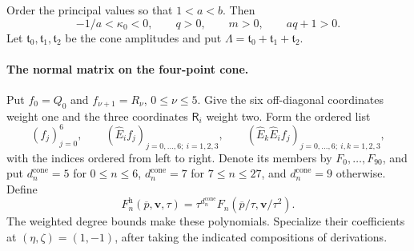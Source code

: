 \documentclass[11pt,a4paper]{article}
\numberwithin{equation}{section}
\theoremstyle{plain}
\theoremstyle{definition}
\theoremstyle{remark}
\begin{document}
Order the principal values so that $1<a<b$. Then
\[
 -1/a<\kappa_0<0,\qquad q>0,\qquad m>0,\qquad aq+1>0.
\]
Let $\mathfrak t_0,\mathfrak t_1,\mathfrak t_2$ be the cone amplitudes and
put $\Lambda=\mathfrak t_0+\mathfrak t_1+\mathfrak t_2$.

\paragraph{The normal matrix on the four-point cone.}
Put $f_0=Q_0$ and $f_{\nu+1}=R_\nu$, $0\le\nu\le5$.
Give the six off-diagonal coordinates weight one and the three
coordinates $\mathsf R_i$ weight two. Form the ordered list
\[
 (f_j)_{j=0}^6,\qquad
 (\widehat E_i f_j)_{j=0,\ldots,6;\ i=1,2,3},\qquad
 (\widehat E_k\widehat E_i f_j)_{j=0,\ldots,6;\ i,k=1,2,3},
\]
with the indices ordered from left to right. Denote its members by
$F_0,\ldots,F_{90}$, and put $d_n^{\mathrm{cone}}=5$ for $0\le n\le6$,
$d_n^{\mathrm{cone}}=7$ for $7\le n\le27$, and $d_n^{\mathrm{cone}}=9$ otherwise. Define
\[
 F_n^{\mathrm h}(\overline p,\boldsymbol v,\tau)
 =\tau^{d_n^{\mathrm{cone}}}F_n(\overline p/\tau,\boldsymbol v/\tau^2).
\]
The weighted degree bounds make these polynomials. Specialize their
coefficients at $(\eta,\zeta)=(1,-1)$, after taking the indicated
compositions of derivations.
\end{document}
